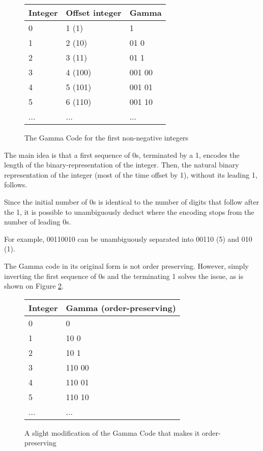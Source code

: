\documentclass{acm_proc_article-sp}
\begin{document}
\begin{figure}
\caption{The Gamma Code for the first non-negative integers}
\label{figure-gamma-encoding}
\center
\begin{tabular}{|l|l|l|}
\hline
Integer & Offset integer & Gamma \\
\hline
0 & 1 (1) & 1 \\
\hline
1 & 2 (10) & 01 0  \\
\hline
2 & 3 (11) & 01 1  \\
\hline
3 & 4 (100) & 001 00 \\
\hline
4 & 5 (101) & 001 01 \\
\hline
5 & 6 (110) & 001 10 \\
\hline
... & ... & ... \\
\hline
\end{tabular}
\end{figure}

 The main idea is that a first sequence of 0s, terminated by a 1, encodes the length of the binary-representation of the integer. Then, the natural binary representation of the integer (most of the time offset by 1), without its leading 1, follows.

Since the initial number of 0s is identical to the number of digits that follow after the 1, it is possible to unambiguously deduct where the encoding stops from the number of leading 0s.

For example, 00110010 can be unambiguously separated into 00110 (5) and 010 (1).

The Gamma code in its original form is not order preserving. However, simply inverting the first sequence of 0s and the terminating 1 solves the issue, as is shown on Figure \ref{figure-gamma-encoding-tweaked}.

\begin{figure}
\caption{A slight modification of the Gamma Code that makes it order-preserving}
\label{figure-gamma-encoding-tweaked}
\center
\begin{tabular}{|l|l|}
\hline
Integer & Gamma (order-preserving) \\
\hline
0 & 0 \\
\hline
1 & 10 0  \\
\hline
2 & 10 1  \\
\hline
3 & 110 00 \\
\hline
4 & 110 01 \\
\hline
5 & 110 10 \\
\hline
... & ... \\
\hline
\end{tabular}
\end{figure}
\end{document}
